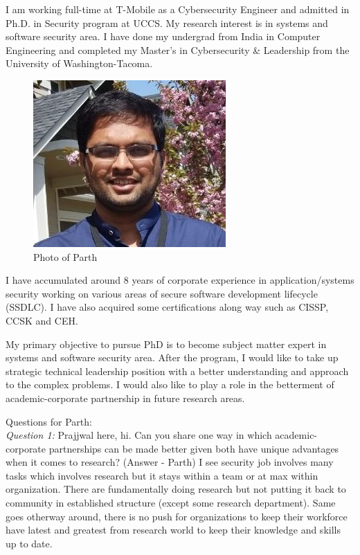I am working full-time at T-Mobile as a Cybersecurity Engineer and admitted in Ph.D. in Security program at UCCS. 
My research interest is in systems and software security area. 
I have done my undergrad from India in Computer Engineering and completed my Master’s in Cybersecurity \& Leadership from the University of Washington-Tacoma. 
\begin{figure}[h!]
\centering
\includegraphics[scale=0.5]{parth_shah.jpg}
\caption{Photo of Parth}
\label{fig:profile}
\end{figure}
I have accumulated around 8 years of corporate experience in application/systems security working on various areas of secure software development lifecycle (SSDLC). 
I have also acquired some certifications along way such as CISSP, CCSK and CEH.  


My primary objective to pursue PhD is to become subject matter expert in systems and software security area. 
After the program, I would like to take up strategic technical leadership position with a better understanding and approach to the complex problems. 
I would also like to play a role in the betterment of academic-corporate partnership in future research areas.

Questions for Parth:\\
\textit{Question 1: }Prajjwal here, hi. Can you share one way in which academic-corporate partnerships can be made better given both have unique advantages when it comes to research?
(Answer - Parth) I see security job involves many tasks which involves research but it stays within a team or at max within organization. 
There are fundamentally doing research but not putting it back to community in established structure (except some research department). 
Same goes otherway around, there is no push for organizations to keep their workforce have latest and greatest from research world to keep their knowledge and skills up to date. 
